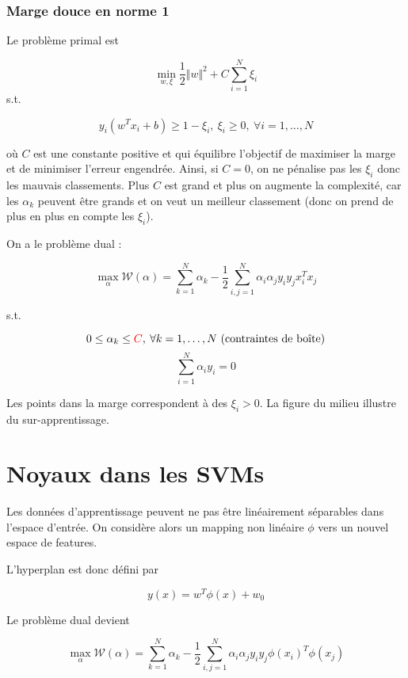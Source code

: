 	\subsubsection{Marge douce en norme 1}
	
	Le problème primal est
	
	$$\min_{w, \xi} \frac{1}{2} \Vert w \Vert^2 + C \sum_{i = 1}^N \xi_i$$
	s.t.
	
	$$y_i(w^T x_i + b) \geq 1 - \xi_i, \: \xi_i \geq 0, \: \forall i = 1, \dots , N$$
	
	où $C$ est une constante positive et qui équilibre l'objectif de maximiser la marge et de minimiser l'erreur engendrée. Ainsi, si $C = 0$, on ne pénalise pas les $\xi_i$ donc les mauvais classements. Plus $C$ est grand et plus on augmente la complexité, car les $\alpha_k$ peuvent être grands et on veut un meilleur classement (donc on prend de plus en plus en compte les $\xi_i$).
	
	
	On a le problème dual :
	
	$$\max_\alpha \mathcal{W}(\alpha) = \sum_{k = 1}^N \alpha_k - \frac{1}{2} \sum_{i, j = 1}^N \alpha_i \alpha_j y_i y_j x_i^T x_j$$
	
	s.t.
	
	$$0 \leq \alpha_k \leq \textcolor{red}{C}, \: \forall k = 1, \dots , N \text{ (contraintes de boîte)}$$
	$$\sum_{i = 1}^N \alpha_i y_i = 0$$
	
	
	Les points dans la marge correspondent à des $\xi_i > 0$. La figure du milieu illustre du sur-apprentissage.
	
\section{Noyaux dans les SVMs}

Les données d'apprentissage peuvent ne pas être linéairement séparables dans l'espace d'entrée. On considère alors un mapping non linéaire $\phi$ vers un nouvel espace de features.


L'hyperplan est donc défini par

$$y(x) = w^T \phi(x) + w_0$$

Le problème dual devient

$$\max_\alpha \mathcal{W}(\alpha) = \sum_{k = 1}^N \alpha_k - \frac{1}{2} \sum_{i, j = 1}^N \alpha_i \alpha_j y_i y_j \phi(x_i)^T \phi(x_j)$$

